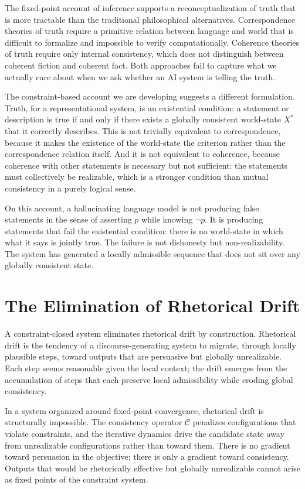 \documentclass[11pt, oneside]{article}
\begin{document}
The fixed-point account of inference supports a reconceptualization of truth that is more tractable than the traditional philosophical alternatives. Correspondence theories of truth require a primitive relation between language and world that is difficult to formalize and impossible to verify computationally. Coherence theories of truth require only internal consistency, which does not distinguish between coherent fiction and coherent fact. Both approaches fail to capture what we actually care about when we ask whether an AI system is telling the truth.

The constraint-based account we are developing suggests a different formulation. Truth, for a representational system, is an existential condition: a statement or description is true if and only if there exists a globally consistent world-state $X^\ast$ that it correctly describes. This is not trivially equivalent to correspondence, because it makes the existence of the world-state the criterion rather than the correspondence relation itself. And it is not equivalent to coherence, because coherence with other statements is necessary but not sufficient: the statements must collectively be realizable, which is a stronger condition than mutual consistency in a purely logical sense.

On this account, a hallucinating language model is not producing false statements in the sense of asserting $p$ while knowing $\lnot p$. It is producing statements that fail the existential condition: there is no world-state in which what it says is jointly true. The failure is not dishonesty but non-realizability. The system has generated a locally admissible sequence that does not sit over any globally consistent state.

\section{The Elimination of Rhetorical Drift}

A constraint-closed system eliminates rhetorical drift by construction. Rhetorical drift is the tendency of a discourse-generating system to migrate, through locally plausible steps, toward outputs that are persuasive but globally unrealizable. Each step seems reasonable given the local context; the drift emerges from the accumulation of steps that each preserve local admissibility while eroding global consistency.

In a system organized around fixed-point convergence, rhetorical drift is structurally impossible. The consistency operator $\mathcal{C}$ penalizes configurations that violate constraints, and the iterative dynamics drive the candidate state away from unrealizable configurations rather than toward them. There is no gradient toward persuasion in the objective; there is only a gradient toward consistency. Outputs that would be rhetorically effective but globally unrealizable cannot arise as fixed points of the constraint system.
\end{document}
